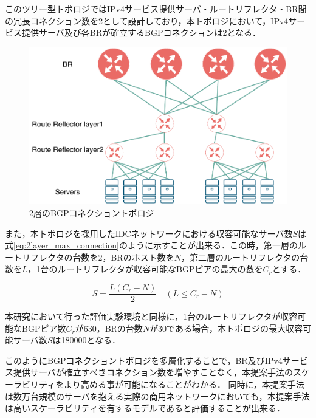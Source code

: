 このツリー型トポロジではIPv4サービス提供サーバ・ルートリフレクタ・BR間の冗長コネクション数を2として設計しており，本トポロジにおいて，IPv4サービス提供サーバ及び各BRが確立するBGPコネクションは2となる．

\begin{figure}[h]
    \begin{center}
    \includegraphics[width=12cm,pagebox=cropbox,clip]{img/2layer_bgp_topology_more_scale.pdf}
    \end{center}
    \caption{2層のBGPコネクショントポロジ}
    \label{fig:2layer_bgp_topology}
\end{figure}


また，本トポロジを採用したIDCネットワークにおける収容可能なサーバ数$S$は式\ref{eq:2layer_max_connection}のように示すことが出来る．この時，第一層のルートリフレクタの台数を2，BRのホスト数を$N$，第二層のルートリフレクタの台数を$L$，1台のルートリフレクタが収容可能なBGPピアの最大の数を$C_r$とする．


\begin{equation}
    S = \frac{L(C_r - N)}{2} \quad (L \leq C_r - N)
    \label{eq:2layer_max_connection}
\end{equation}


本研究において行った評価実験環境と同様に，1台のルートリフレクタが収容可能なBGPピア数$C_r$が630，BRの台数$N$が30である場合，本トポロジの最大収容可能サーバ数$S$は180000となる．

このようにBGPコネクショントポロジを多層化することで，BR及びIPv4サービス提供サーバが確立すべきコネクション数を増やすことなく，本提案手法のスケーラビリティをより高める事が可能になることがわかる．
同時に，本提案手法は数万台規模のサーバを抱える実際の商用ネットワークにおいても，本提案手法は高いスケーラビリティを有するモデルであると評価することが出来る．





